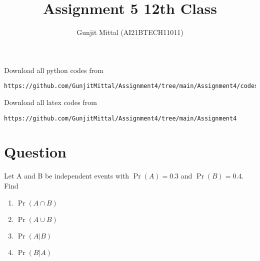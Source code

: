 \documentclass[journal,12pt,twocolumn]{IEEEtran}
\begin{document}
\let\vec\mathbf{}
\def\putbox#1#2#3{\makebox[0in][l]{\makebox[#1][l]{}\raisebox{\baselineskip}[0in][0in]{\raisebox{#2}[0in][0in]{#3}}}}
     \def\rightbox#1{\makebox[0in][r]{#1}}
     \def\centbox#1{\makebox[0in]{#1}}
     \def\topbox#1{\raisebox{-\baselineskip}[0in][0in]{#1}}
     \def\midbox#1{\raisebox{-0.5\baselineskip}[0in][0in]{#1}}
\vspace{3cm}
\title{Assignment 5 12th Class}
\author{Gunjit Mittal (AI21BTECH11011)}
\maketitle
Download all python codes from 
\begin{lstlisting}
https://github.com/GunjitMittal/Assignment4/tree/main/Assignment4/codes
\end{lstlisting}
Download all latex codes from 
\begin{lstlisting}
https://github.com/GunjitMittal/Assignment4/tree/main/Assignment4 
\end{lstlisting} 
\section{Question}
Let A and B be independent events with $\Pr(A) = 0.3$ and $\Pr(B) = 0.4$. Find
\begin{enumerate}[label= (\roman{enumi})]
    \item $\Pr(A \cap  B)$ 
    \item $\Pr(A \cup  B)$
    \item $\Pr(A|B)$
    \item $\Pr(B|A)$
\end{enumerate}
\end{document}
